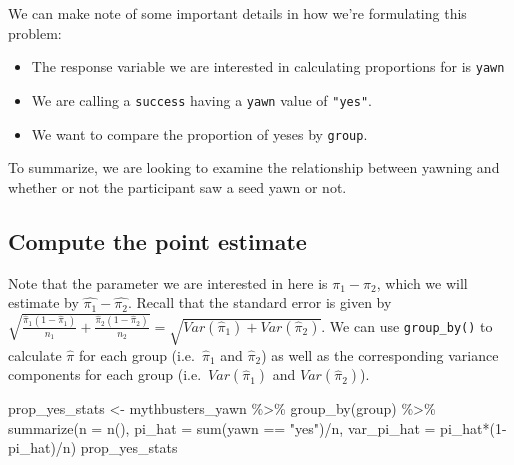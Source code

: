 \documentclass[
  letterpaper,
  DIV=11,
  numbers=noendperiod]{scrreprt}
\newenvironment{Shaded}{\begin{snugshade}}{\end{snugshade}}
\newcommand{\AttributeTok}[1]{\textcolor[rgb]{0.40,0.45,0.13}{#1}}
\newcommand{\DecValTok}[1]{\textcolor[rgb]{0.68,0.00,0.00}{#1}}
\newcommand{\FunctionTok}[1]{\textcolor[rgb]{0.28,0.35,0.67}{#1}}
\newcommand{\NormalTok}[1]{\textcolor[rgb]{0.00,0.23,0.31}{#1}}
\newcommand{\OtherTok}[1]{\textcolor[rgb]{0.00,0.23,0.31}{#1}}
\newcommand{\SpecialCharTok}[1]{\textcolor[rgb]{0.37,0.37,0.37}{#1}}
\newcommand{\StringTok}[1]{\textcolor[rgb]{0.13,0.47,0.30}{#1}}
\providecommand{\tightlist}{%
  \setlength{\itemsep}{0pt}\setlength{\parskip}{0pt}}\usepackage{longtable,booktabs,array}
\theoremstyle{definition}
\theoremstyle{remark}
\begin{document}
We can make note of some important details in how we're formulating this
problem:

\begin{itemize}
\tightlist
\item
  The response variable we are interested in calculating proportions for
  is \texttt{yawn}
\item
  We are calling a \texttt{success} having a \texttt{yawn} value of
  \texttt{"yes"}.
\item
  We want to compare the proportion of yeses by \texttt{group}.
\end{itemize}

To summarize, we are looking to examine the relationship between yawning
and whether or not the participant saw a seed yawn or not.

\hypertarget{compute-the-point-estimate}{%
\subsection{Compute the point
estimate}\label{compute-the-point-estimate}}

Note that the parameter we are interested in here is \(\pi_1 - \pi_2\),
which we will estimate by \(\hat{\pi_1} - \hat{\pi_2}\). Recall that the
standard error is given by
\(\sqrt{\frac{\hat{\pi}_1(1-\hat{\pi}_1)}{n_1} + \frac{\hat{\pi}_2(1 - \hat{\pi}_2)}{n_2}} = \sqrt{Var(\hat{\pi}_1) + Var(\hat{\pi}_2)}\).
We can use \texttt{group\_by()} to calculate \(\hat{\pi}\) for each
group (i.e.~\(\hat{\pi}_1\) and \(\hat{\pi}_2\)) as well as the
corresponding variance components for each group
(i.e.~\(Var(\hat{\pi}_1)\) and \(Var(\hat{\pi}_2)\)).

\begin{Shaded}
\begin{Highlighting}[]
\NormalTok{prop\_yes\_stats }\OtherTok{\textless{}{-}}\NormalTok{ mythbusters\_yawn }\SpecialCharTok{\%\textgreater{}\%} 
  \FunctionTok{group\_by}\NormalTok{(group) }\SpecialCharTok{\%\textgreater{}\%} 
  \FunctionTok{summarize}\NormalTok{(}\AttributeTok{n =} \FunctionTok{n}\NormalTok{(),}
            \AttributeTok{pi\_hat =} \FunctionTok{sum}\NormalTok{(yawn }\SpecialCharTok{==} \StringTok{"yes"}\NormalTok{)}\SpecialCharTok{/}\NormalTok{n,}
            \AttributeTok{var\_pi\_hat =}\NormalTok{ pi\_hat}\SpecialCharTok{*}\NormalTok{(}\DecValTok{1}\SpecialCharTok{{-}}\NormalTok{pi\_hat)}\SpecialCharTok{/}\NormalTok{n) }
\NormalTok{prop\_yes\_stats}
\end{Highlighting}
\end{Shaded}
\end{document}
